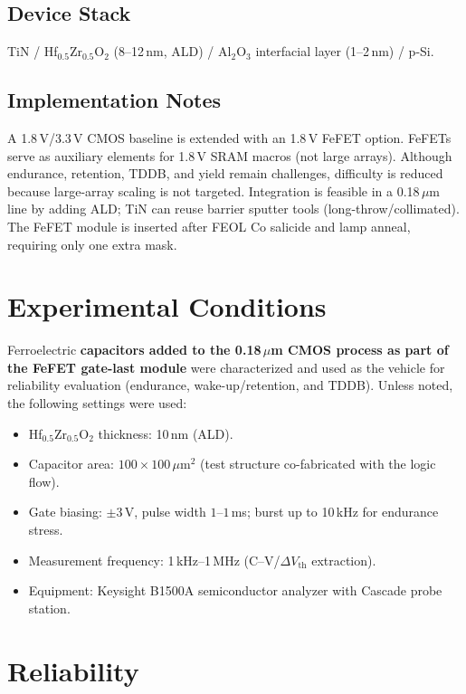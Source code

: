 \documentclass[journal]{IEEEtran}
\begin{document}
\subsection*{Device Stack}
TiN / Hf$_{0.5}$Zr$_{0.5}$O$_2$ (8–12\,nm, ALD) / Al$_2$O$_3$ interfacial layer (1–2\,nm) / p-Si.

\subsection*{Implementation Notes}
A 1.8\,V/3.3\,V CMOS baseline is extended with an 1.8\,V FeFET option. FeFETs serve as auxiliary elements for 1.8\,V SRAM macros (not large arrays). Although endurance, retention, TDDB, and yield remain challenges, difficulty is reduced because large-array scaling is not targeted. Integration is feasible in a 0.18\,$\mu$m line by adding ALD; TiN can reuse barrier sputter tools (long-throw/collimated). The FeFET module is inserted after FEOL Co salicide and lamp anneal, requiring only one extra mask.

\section{Experimental Conditions}
Ferroelectric \textbf{capacitors added to the 0.18\,$\mu$m CMOS process as part of the FeFET gate-last module} were characterized and used as the vehicle for reliability evaluation (endurance, wake-up/retention, and TDDB). Unless noted, the following settings were used:
\begin{itemize}
  \item Hf$_{0.5}$Zr$_{0.5}$O$_2$ thickness: 10\,nm (ALD).
  \item Capacitor area: $100\times100\,\mu$m$^2$ (test structure co-fabricated with the logic flow).
  \item Gate biasing: $\pm 3$\,V, pulse width $1$–$1$\,ms; burst up to 10\,kHz for endurance stress.
  \item Measurement frequency: 1\,kHz–1\,MHz (C–V/$\Delta V_\mathrm{th}$ extraction).
  \item Equipment: Keysight B1500A semiconductor analyzer with Cascade probe station.
\end{itemize}

\section{Reliability}
\end{document}
